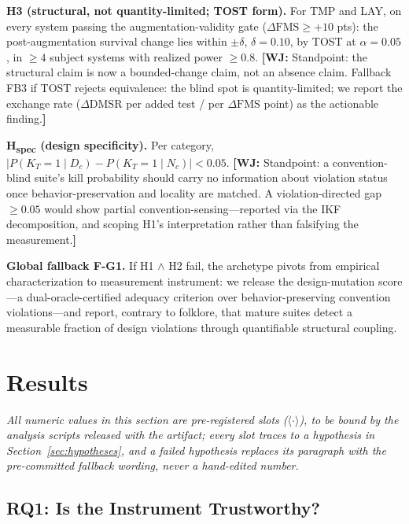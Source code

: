 \documentclass[conference]{IEEEtran}
\newcommand{\ph}[1]{\colorbox{yellow!35}{\small$\langle$\textsf{#1}$\rangle$}}
\newcommand{\wj}[1]{{\color{blue}\footnotesize\textbf{[WJ:} #1\textbf{]}}}
\newcommand{\dmsr}{\mathrm{DMSR}}
\newcommand{\fms}{\mathrm{FMS}}
\begin{document}
\textbf{H3 (structural, not quantity-limited; TOST form).} For TMP and LAY, on every system passing the augmentation-validity gate ($\Delta\fms \geq +10$ pts): the post-augmentation survival change lies within $\pm\delta$, $\delta = 0.10$, by TOST at $\alpha = 0.05$, in $\geq 4$ subject systems with realized power $\geq 0.8$. \wj{Standpoint: the structural claim is now a bounded-change claim, not an absence claim. Fallback FB3 if TOST rejects equivalence: the blind spot is quantity-limited; we report the exchange rate ($\Delta\dmsr$ per added test / per $\Delta\fms$ point) as the actionable finding.}

\textbf{H\textsubscript{spec} (design specificity).} Per category, $|P(K_T{=}1 \mid D_c) - P(K_T{=}1 \mid N_c)| < 0.05$. \wj{Standpoint: a convention-blind suite's kill probability should carry no information about violation status once behavior-preservation and locality are matched. A violation-directed gap $\geq 0.05$ would show partial convention-sensing---reported via the IKF decomposition, and scoping H1's interpretation rather than falsifying the measurement.}

\textbf{Global fallback F-G1.} If H1 $\wedge$ H2 fail, the archetype pivots from empirical characterization to measurement instrument: we release the design-mutation score---a dual-oracle-certified adequacy criterion over behavior-preserving convention violations---and report, contrary to folklore, that mature suites detect a measurable fraction of design violations through quantifiable structural coupling.

\section{Results}\label{sec:results}

\emph{All numeric values in this section are pre-registered slots (\ph{$\cdot$}), to be bound by the analysis scripts released with the artifact; every slot traces to a hypothesis in Section~\ref{sec:hypotheses}, and a failed hypothesis replaces its paragraph with the pre-committed fallback wording, never a hand-edited number.}

\subsection{RQ1: Is the Instrument Trustworthy?}\label{sec:results-rq1}
\end{document}
